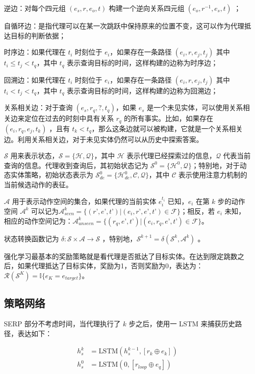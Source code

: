 \documentclass[a4paper, AutoFakeBold]{article}
\begin{document}
逆边：对每个四元组 $(e_s,r,e_o,t)$ 构建一个逆向关系四元组 $(e_o,r^{-1},e_s,t)$ ；

自循环边：是指代理可以在某一次跳跃中保持原来的位置不变，这可以作为代理抵达目标的判断依据；

时序边：如果代理在 $t_i$ 时刻位于 $e_i$，如果存在一条路径 $(e_i,r,e_j,t_j)$ 其中 $t_i\le t_j<t_q$，其中 $t_q$ 表示查询目标的时间，这样构建的边称为时序边；

回溯边：如果代理在 $t_i$ 时刻位于 $e_i$，如果存在一条路径 $(e_i,r,e_j,t_j)$ 其中 $t_i< t_j<t_q$，其中 $t_q$ 表示查询目标的时间，这样构建的边称为回溯边；

关系相关边：对于查询 $(e_s,r_q,?,t_q)$，如果 $e_s$ 是一个未见实体，可以使用关系相关边来定位在过去的时刻中具有关系 $r_q$ 的所有事实。比如，如果存在 $(e_i,r_q,e_j,t_k)$ ，且有 $t_k<t_q$，那么这条边就可以被构建，它就是一个关系相关边。利用关系相关边，对于未见实体仍然可以从历史中探索答案。

${\mathcal S}$ 用来表示状态，${\mathcal S}=\{{\mathcal H},{\mathcal Q}\}$，其中 ${\mathcal H}$ 表示代理已经探索过的信息，${\mathcal Q}$ 代表当前查询的信息。代理收到查询后，其初始状态记为 ${\mathcal S}^0=\{{\mathcal H}^0,{\mathcal Q}\}$；特别地，对于动态实体策略，初始状态表示为 ${\mathcal S}^0_{de}=\{{\mathcal H}^0_{de},{\mathcal C},{\mathcal Q}\}$，其中 ${\mathcal C}$ 表示使用注意力机制的当前候选动作的表征。

${\mathcal A}$ 用于表示动作空间的集合，如果代理的当前实体 $e_i^{t_i}$ 已知，$e_i$ 在第 $k$ 步的动作空间 ${\mathcal A}^k$ 可以记为${\mathcal A}^k_{seen}=\{(r’,e’,t’)|(e_i,r’,e’,t’)\in{\mathcal F}\}$；相反，若 $e_i$ 未知，相应的动作空间记为：${\mathcal A}^k_{unseen}=\{(r_q,e’,t’)|(e_i,r_q,e’,t’)\in{\mathcal F}\}$。

状态转换函数记为 $\delta:{\mathcal S}\times{\mathcal A}\rightarrow{\mathcal S}$ ，特别地，${\mathcal S}^{k+1}=\delta({\mathcal S}^k,{\mathcal A}^k)$ 。

强化学习最基本的奖励策略就是看代理是否抵达了目标实体。在达到限定跳数之后，如果代理抵达了目标实体，奖励为1，否则奖励为0，表达为：${\mathcal R}({\mathcal S}^K)={{\mathbb I}\{e_K=e_{target}\}}$。


\subsection{策略网络}

SERP 部分不考虑时间，当代理执行了 $k$ 步之后，使用一 LSTM 来捕获历史路径，表达如下：

\begin{equation}
	\begin{aligned}
h^k_s & =\text{LSTM}(h_s^{k-1},[r_k\oplus e_k]) \\ 
h^0_s & =\text{LSTM}(0,[r_{loop}\oplus e_q])
	\end{aligned}
\end{equation}
\end{document}
